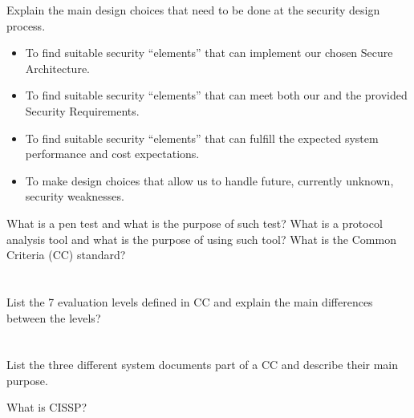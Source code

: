\begin{questions}
\question{} Explain the main design choices that need to be done at the security design process.
  \begin{solution}
    \begin{itemize}[noitemsep]
    \item To find suitable security ``elements'' that can implement our chosen Secure Architecture.
    \item To find suitable security ``elements'' that can meet both our and the provided Security Requirements.
    \item To find suitable security ``elements'' that can fulfill the expected system performance and cost expectations.
    \item To make design choices that allow us to handle future, currently unknown, security weaknesses.
    \end{itemize}
  \end{solution}

\question{} What is a pen test and what is the purpose of such test?
\question{} What is a protocol analysis tool and what is the purpose of using such tool?
\question{} What is the Common Criteria (CC) standard?
  \begin{parts}
  \part{} List the 7 evaluation levels defined in CC and explain the main differences between the levels?
  \part{} List the three different system documents part of a CC and describe their main purpose.
  \end{parts}

\question{} What is CISSP?\@
\end{questions}

